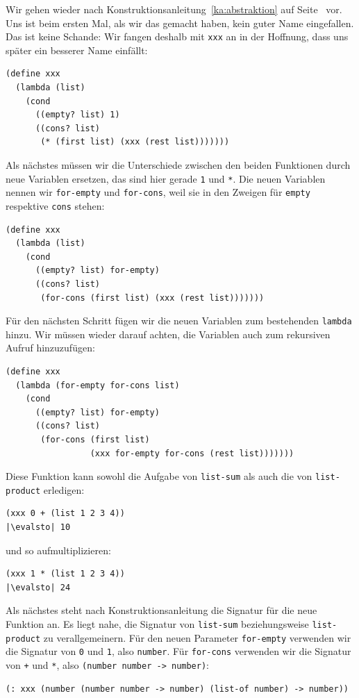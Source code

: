 Wir gehen wieder nach Konstruktionsanleitung~\ref{ka:abstraktion} auf
Seite~\pageref{ka:abstraktion} vor.  Uns ist beim ersten Mal, als wir
das gemacht haben, kein guter Name eingefallen.  Das ist keine
Schande: Wir fangen deshalb mit \lstinline{xxx} an in der Hoffnung,
dass uns später ein besserer Name einfällt:
%
\begin{lstlisting}
(define xxx
  (lambda (list)
    (cond
      ((empty? list) 1)
      ((cons? list)
       (* (first list) (xxx (rest list)))))))
\end{lstlisting}
%
Als nächstes müssen wir die Unterschiede zwischen den beiden
Funktionen durch neue Variablen ersetzen, das sind hier gerade
\lstinline{1} und \lstinline{*}.  Die neuen Variablen nennen wir
\lstinline{for-empty} und \lstinline{for-cons}, weil sie in den
Zweigen für \lstinline{empty} respektive \lstinline{cons} stehen:
%
\begin{lstlisting}
(define xxx
  (lambda (list)
    (cond
      ((empty? list) for-empty)
      ((cons? list)
       (for-cons (first list) (xxx (rest list)))))))
\end{lstlisting}
%
Für den nächsten Schritt fügen wir die neuen Variablen zum bestehenden
\lstinline{lambda} hinzu.  Wir müssen wieder darauf achten, die
Variablen auch zum rekursiven Aufruf hinzuzufügen:
%
\begin{lstlisting}
(define xxx
  (lambda (for-empty for-cons list)
    (cond
      ((empty? list) for-empty)
      ((cons? list)
       (for-cons (first list)
                 (xxx for-empty for-cons (rest list)))))))
\end{lstlisting}
%
Diese Funktion kann sowohl die Aufgabe von \lstinline{list-sum} als
auch die von \lstinline{list-product} erledigen:
%
\begin{lstlisting}
(xxx 0 + (list 1 2 3 4))
|\evalsto| 10
\end{lstlisting}
%
und so aufmultiplizieren:
%
\begin{lstlisting}
(xxx 1 * (list 1 2 3 4))
|\evalsto| 24
\end{lstlisting}
%
Als nächstes steht nach Konstruktionsanleitung die Signatur für die
neue Funktion an.  Es liegt nahe, die Signatur von
\lstinline{list-sum} beziehungsweise \lstinline{list-product} zu
verallgemeinern.  Für den neuen Parameter \lstinline{for-empty}
verwenden wir die Signatur von \lstinline{0} und \lstinline{1}, also
\lstinline{number}.  Für \lstinline{for-cons} verwenden wir die
Signatur von \lstinline{+} und \lstinline{*}, also
\lstinline{(number number -> number)}:
%
\begin{lstlisting}
(: xxx (number (number number -> number) (list-of number) -> number))
\end{lstlisting}
